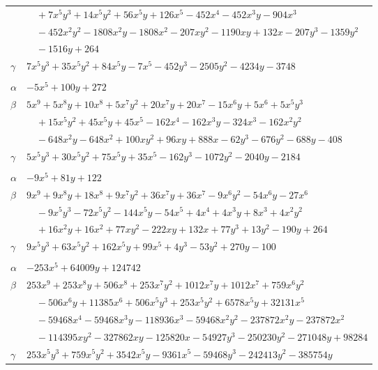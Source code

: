 \documentclass[11pt]{article}
\begin{document}
\begin{longtable}{@{}ll@{}}
 & $\quad +7x^{5}y^{3}+14x^{5}y^{2}+56x^{5}y+126x^{5}-452x^{4}-452x^{3}y-904x^{3}$\\
 & $\quad -452x^{2}y^{2}-1808x^{2}y-1808x^{2}-207xy^{2}-1190xy+132x-207y^{3}-1359y^{2}$\\
 & $\quad -1516y+264$\\
$\gamma$ & $7x^{5}y^{3}+35x^{5}y^{2}+84x^{5}y-7x^{5}-452y^{3}-2505y^{2}-4234y-3748$\\
\addlinespace[3pt]
\multicolumn{2}{@{}l}{$\{i,j\}=\{16,20\}$, $k_{ij}=2^{4}\cdot 7\cdot 17$}\\
$\alpha$ & $-5x^{5}+100y+272$\\
$\beta$ & $5x^{9}+5x^{8}y+10x^{8}+5x^{7}y^{2}+20x^{7}y+20x^{7}-15x^{6}y+5x^{6}+5x^{5}y^{3}$\\
 & $\quad +15x^{5}y^{2}+45x^{5}y+45x^{5}-162x^{4}-162x^{3}y-324x^{3}-162x^{2}y^{2}$\\
 & $\quad -648x^{2}y-648x^{2}+100xy^{2}+96xy+888x-62y^{3}-676y^{2}-688y-408$\\
$\gamma$ & $5x^{5}y^{3}+30x^{5}y^{2}+75x^{5}y+35x^{5}-162y^{3}-1072y^{2}-2040y-2184$\\
\addlinespace[3pt]
\multicolumn{2}{@{}l}{$\{i,j\}=\{16,30\}$, $k_{ij}=2^{5}\cdot 5$}\\
$\alpha$ & $-9x^{5}+81y+122$\\
$\beta$ & $9x^{9}+9x^{8}y+18x^{8}+9x^{7}y^{2}+36x^{7}y+36x^{7}-9x^{6}y^{2}-54x^{6}y-27x^{6}$\\
 & $\quad -9x^{5}y^{3}-72x^{5}y^{2}-144x^{5}y-54x^{5}+4x^{4}+4x^{3}y+8x^{3}+4x^{2}y^{2}$\\
 & $\quad +16x^{2}y+16x^{2}+77xy^{2}-222xy+132x+77y^{3}+13y^{2}-190y+264$\\
$\gamma$ & $9x^{5}y^{3}+63x^{5}y^{2}+162x^{5}y+99x^{5}+4y^{3}-53y^{2}+270y-100$\\
\addlinespace[3pt]
\multicolumn{2}{@{}l}{$\{i,j\}=\{16,34\}$, $k_{ij}=2^{6}\cdot 3^{3}\cdot 5^{2}\cdot 7$}\\
$\alpha$ & $-253x^{5}+64009y+124742$\\
$\beta$ & $253x^{9}+253x^{8}y+506x^{8}+253x^{7}y^{2}+1012x^{7}y+1012x^{7}+759x^{6}y^{2}$\\
 & $\quad -506x^{6}y+11385x^{6}+506x^{5}y^{3}+253x^{5}y^{2}+6578x^{5}y+32131x^{5}$\\
 & $\quad -59468x^{4}-59468x^{3}y-118936x^{3}-59468x^{2}y^{2}-237872x^{2}y-237872x^{2}$\\
 & $\quad -114395xy^{2}-327862xy-125820x-54927y^{3}-250230y^{2}-271048y+98284$\\
$\gamma$ & $253x^{5}y^{3}+759x^{5}y^{2}+3542x^{5}y-9361x^{5}-59468y^{3}-242413y^{2}-385754y$\\

\end{longtable}
\end{document}
